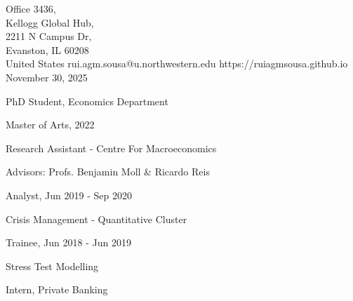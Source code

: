 \documentclass{practical-resume}
\begin{document}
\namehead

\begin{address}{
	Office 3436, \\
	Kellogg Global Hub, \\
	2211 N Campus Dr, \\
	Evanston, IL 60208 \\
	United States
}
{rui.agm.sousa@u.northwestern.edu}
{https://ruiagmsousa.github.io}
{November 30, 2025}
\end{address}

\begin{position}{PhD Student, Economics Department}{}
	\item Master of Arts, 2022
\end{position}


	\begin{position}{Research Assistant - }{Centre For Macroeconomics}
		\item Advisors: Profs. Benjamin Moll \& Ricardo Reis
	\end{position}


	\begin{position}{Analyst, }{Jun 2019 - Sep 2020}
		\item Crisis Management - Quantitative Cluster
	\end{position}
	\begin{position}{Trainee, }{Jun 2018 - Jun 2019}
		\item Stress Test Modelling
	\end{position}
		
	\begin{position}[noitemize]{Intern, }{Private Banking}
	\end{position}
	
	
\end{document}
